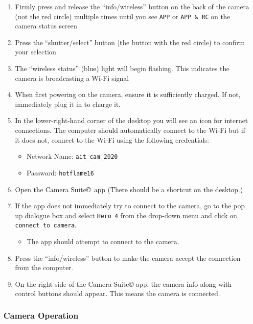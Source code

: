 \begin{enumerate}
\def\labelenumi{\arabic{enumi}.}
\tightlist
\item
  Firmly press and release the ``info/wireless'' button on the back of
  the camera (not the red circle) multiple times until you see
  \texttt{APP} or \texttt{APP\ \&\ RC} on the camera status screen
\item
  Press the ``shutter/select'' button (the button with the red circle)
  to confirm your selection
\item
  The ``wireless status'' (blue) light will begin flashing. This
  indicates the camera is broadcasting a Wi-Fi signal
\item
  When first powering on the camera, ensure it is sufficiently charged.
  If not, immediately plug it in to charge it.
\item
  In the lower-right-hand corner of the desktop you will see an icon for
  internet connections. The computer should automatically connect to the
  Wi-Fi but if it does not, connect to the Wi-Fi using the following
  credentials:

  \begin{itemize}
  \tightlist
  \item
    Network Name: \texttt{ait\_cam\_2020}
  \item
    Password: \texttt{hotflame16}
  \end{itemize}
\item
  Open the Camera Suite©~app (There should be a shortcut on the
  desktop.)
\item
  If the app does not immediately try to connect to the camera, go to
  the pop up dialogue box and select \texttt{Hero\ 4} from the drop-down
  menu and click on \texttt{connect\ to\ camera}.

  \begin{itemize}
  \tightlist
  \item
    The app should attempt to connect to the camera.
  \end{itemize}
\item
  Press the ``info/wireless'' button to make the camera accept the
  connection from the computer.
\item
  On the right side of the Camera Suite© app, the camera info along with
  control buttons should appear. This means the camera is connected.
\end{enumerate}

\hypertarget{camera-operation}{%
\subsubsection{Camera Operation}\label{camera-operation}}

